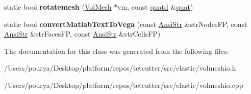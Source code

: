 \begin{DoxyCompactItemize}
\item 
\hypertarget{classps_1_1elastic_1_1VolMeshIO_a6ddc2dfa5b9f5901aae0d9853cf288ff}{}static bool {\bfseries rotatemesh} (\hyperlink{classps_1_1elastic_1_1VolMesh}{Vol\+Mesh} $\ast$vm, const \hyperlink{classps_1_1base_1_1Quaternion}{quatd} \&\hyperlink{classps_1_1base_1_1Quaternion}{quat})\label{classps_1_1elastic_1_1VolMeshIO_a6ddc2dfa5b9f5901aae0d9853cf288ff}

\item 
\hypertarget{classps_1_1elastic_1_1VolMeshIO_a711a2ff215780979e61c2ab362e683d9}{}static bool {\bfseries convert\+Matlab\+Text\+To\+Vega} (const \hyperlink{classps_1_1base_1_1CAString}{Ansi\+Str} \&str\+Nodes\+F\+P, const \hyperlink{classps_1_1base_1_1CAString}{Ansi\+Str} \&str\+Faces\+F\+P, const \hyperlink{classps_1_1base_1_1CAString}{Ansi\+Str} \&str\+Cells\+F\+P)\label{classps_1_1elastic_1_1VolMeshIO_a711a2ff215780979e61c2ab362e683d9}

\end{DoxyCompactItemize}


The documentation for this class was generated from the following files\+:\begin{DoxyCompactItemize}
\item 
/\+Users/pourya/\+Desktop/platform/repos/tetcutter/src/elastic/volmeshio.\+h\item 
/\+Users/pourya/\+Desktop/platform/repos/tetcutter/src/elastic/volmeshio.\+cpp\end{DoxyCompactItemize}
